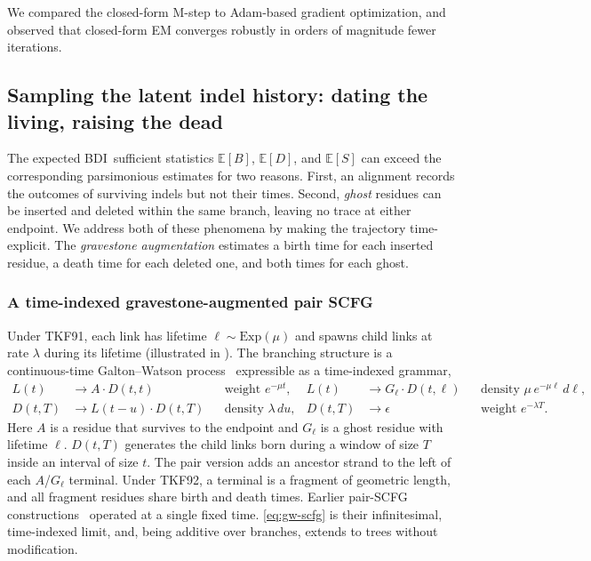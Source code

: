 \documentclass[11pt]{article}
\newcommand{\BDI}{\textsc{BDI}}
\newcommand{\E}{\mathbb{E}}
\newcommand{\ins}{\lambda}
\newcommand{\del}{\mu}
\begin{document}
We compared the closed-form M-step to Adam-based gradient optimization, and observed
that closed-form EM converges robustly in orders of magnitude fewer iterations.

\subsection{Sampling the latent indel history: dating the living, raising the dead}
\label{sec:gravestone}

The expected \BDI\ sufficient statistics $\E[B]$, $\E[D]$, and $\E[S]$
can exceed the corresponding parsimonious estimates for two reasons.
First, an alignment records the outcomes of surviving indels but not their times. 
Second, \emph{ghost} residues can be inserted and deleted within the same branch, 
leaving no trace at either endpoint. We address both of these phenomena by making the trajectory time-explicit. The \emph{gravestone augmentation} estimates a 
birth time for each inserted residue, a death time for each deleted one, 
and both times for each ghost.


\subsubsection{A time-indexed gravestone-augmented pair SCFG}
Under TKF91, each link has lifetime $\ell\sim\mathrm{Exp}(\del)$ and spawns child
links at rate $\ins$ during its lifetime (illustrated in ). The branching structure is a
continuous-time Galton--Watson process~\citep{Metzler2003} expressible as
a time-indexed grammar,
\begin{equation}
\label{eq:gw-scfg}
\begin{aligned}
L(t) &\to A \cdot D(t,t)
        && \text{weight } e^{-\del t}, &
L(t) &\to G_\ell \cdot D(t,\ell)
        && \text{density } \del\, e^{-\del\ell}\,d\ell,\\
D(t,T) &\to L(t-u) \cdot D(t,T)
        && \text{density } \ins\, du, &
D(t,T) &\to \epsilon
        && \text{weight } e^{-\ins T}.
\end{aligned}
\end{equation}
Here $A$ is a residue that survives to the endpoint and $G_\ell$ is a
ghost residue with lifetime $\ell$. $D(t,T)$ generates the
child links born during a window of size $T$ inside an interval of size
$t$. The pair version adds an ancestor strand to the left of each $A$/$G_\ell$ terminal.
Under TKF92, a terminal is a fragment of geometric length, and all fragment
residues share birth and death times.
Earlier pair-SCFG 
constructions~\citep{Sankoff85,KnudsenHein1999,Rivas2008,HolmesRubin2002,HolmesRubin2002psb}
operated at a single fixed time. \eqref{eq:gw-scfg} is their
infinitesimal, time-indexed limit, and, being additive over branches,
extends to trees without modification.
\end{document}
